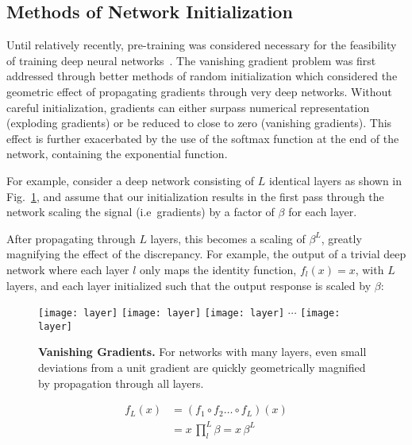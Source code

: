 \documentclass[thesis]{subfiles}
\begin{document}
\subsection{Methods of Network Initialization}\label{ssec:init}
Until relatively recently, pre-training was considered necessary for the feasibility of training deep neural networks~\citep{hinton2006reducing}. The vanishing gradient problem was first addressed through better methods of random initialization which considered the geometric effect of propagating gradients through very deep networks. Without careful initialization, gradients can either surpass numerical representation (exploding gradients) or be reduced to close to zero (vanishing gradients). This effect is further exacerbated by the use of the softmax function at the end of the network, containing the exponential function.

For example, consider a deep network consisting of $L$ identical layers as shown in Fig.~\ref{fig:manylayers}, and assume that our initialization results in the first pass through the network scaling the signal (i.e~gradients) by a factor of $\beta$ for each layer.

After propagating through $L$ layers, this becomes a scaling of $\beta^L$, greatly magnifying the effect of the discrepancy. For example, the output of a trivial deep network  where each layer $l$ only maps the identity function, $f_{l}(x) = x$, with $L$ layers, and each layer initialized such that the output response is scaled by $\beta$:

\begin{figure}[tbp]
	\texttt{[image: layer]}
	\texttt{[image: layer]}
	\texttt{[image: layer]}
	$\cdots$
	\texttt{[image: layer]}
	\caption[Vanishing Gradients]{\textbf{Vanishing Gradients.} For networks with many layers, even small deviations from a unit gradient are quickly geometrically magnified by propagation through all layers.}
	\label{fig:manylayers}
\end{figure}
\begin{equation}
\begin{aligned}
	f_L(x) & = (f_1 \circ f_2 \ldots \circ f_L) (x)\\
	& = x \, \prod^{L}_{l} \beta = x\, \beta^L
\end{aligned}
\end{equation}
\end{document}
